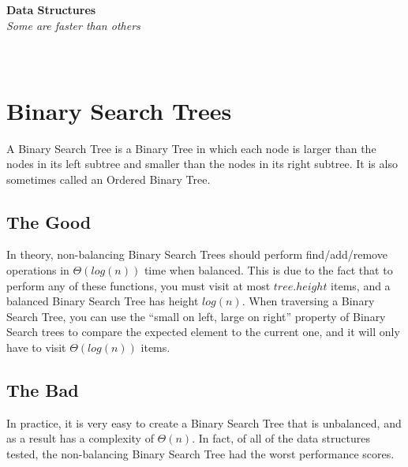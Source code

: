 \documentclass{muformallab}
\begin{document}
  \begin{titlepage}
    \begin{center}
      \Large\textbf{Data Structures}\\
      \large\textit{Some are faster than others}\\
      \large{}\\
      \large{}\\
      \large{}
    \end{center}
  \end{titlepage}

  \section{Binary Search Trees}

  A Binary Search Tree is a Binary Tree in which each node is larger than
  the nodes in its left subtree and smaller than the nodes in its right
  subtree. It is also sometimes called an Ordered Binary Tree.

  \subsection{The Good}

  In theory, non-balancing Binary Search Trees should perform
  find/add/remove operations in $\Theta \left( log \left( n \right)
  \right)$ time when balanced. This is due to the fact that to perform any
  of these functions, you must visit at most $tree.height$ items, and
  a balanced Binary Search Tree has height $log \left( n \right)$. When
  traversing a Binary Search Tree, you can use the ``small on left, large
  on right'' property of Binary Search trees to compare the expected
  element to the current one, and it will only have to visit $\Theta
  \left( log \left( n \right) \right)$ items.

  \subsection{The Bad}

  In practice, it is very easy to create a Binary Search Tree that is
  unbalanced, and as a result has a complexity of $\Theta \left(
  n \right)$. In fact, of all of the data structures tested, the
  non-balancing Binary Search Tree had the worst performance scores.
\end{document}
